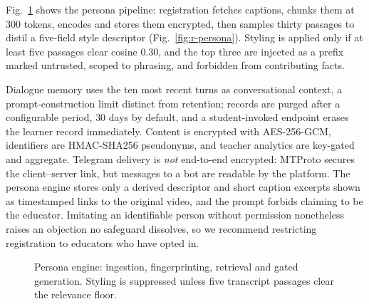 \documentclass[conference]{IEEEtran}
\begin{document}
Fig.~\ref{fig:persona} shows the persona pipeline: registration fetches
captions, chunks them at $300$ tokens, encodes and stores them encrypted, then
samples thirty passages to distil a five-field style descriptor
(Fig.~\ref{fig:r-persona}). Styling is applied only if at least five passages
clear cosine $0.30$, and the top three are injected as a prefix marked
untrusted, scoped to phrasing, and forbidden from contributing facts.

Dialogue memory uses the ten most recent turns as conversational context, a
prompt-construction limit distinct from retention; records are purged after a
configurable period, $30$ days by default, and a student-invoked endpoint erases
the learner record immediately. Content is encrypted with AES-256-GCM,
identifiers are HMAC-SHA256 pseudonyms, and teacher analytics are key-gated and
aggregate. Telegram delivery is \emph{not} end-to-end encrypted: MTProto secures
the client--server link, but messages to a bot are readable by the platform. The
persona engine stores only a derived descriptor and short caption excerpts shown
as timestamped links to the original video, and the prompt forbids claiming to
be the educator. Imitating an identifiable person without permission
nonetheless raises an objection no safeguard dissolves, so we recommend
restricting registration to educators who have opted in.

\begin{figure}[!t]
\centering
{}
\caption{Persona engine: ingestion, fingerprinting, retrieval and gated
generation. Styling is suppressed unless five transcript passages clear the
relevance floor.}
\label{fig:persona}
\end{figure}
\end{document}
